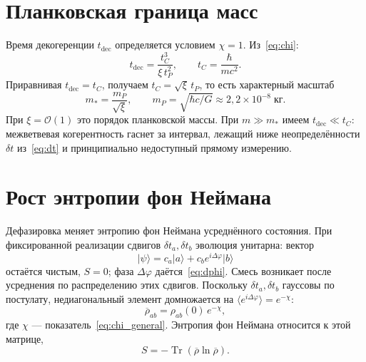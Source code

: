 \documentclass[12pt,a4paper]{article}
\begin{document}
\section{Планковская граница масс}
\label{sec:planck}

Время декогеренции $t_{\mathrm{dec}}$ определяется условием $\chi=1$. Из~\eqref{eq:chi}:
\begin{equation}
t_{\mathrm{dec}}=\frac{t_C^3}{\xi\,t_P^2},
\qquad
t_C=\frac{\hbar}{mc^2}.
\label{eq:tdec}
\end{equation}
Приравнивая $t_{\mathrm{dec}}=t_C$, получаем $t_C=\sqrt{\xi}\,t_P$, то есть характерный масштаб
\begin{equation}
m_\ast=\frac{m_P}{\sqrt{\xi}},
\qquad
m_P=\sqrt{\hbar c/G}\approx 2{,}2\times10^{-8}\;\text{кг}.
\end{equation}
При $\xi=\mathcal O(1)$ это порядок планковской массы. При $m\gg m_\ast$ имеем $t_{\mathrm{dec}}\ll t_C$: межветвевая когерентность гаснет за интервал, лежащий ниже неопределённости $\delta t$ из~\eqref{eq:dt} и принципиально недоступный прямому измерению.

\section{Рост энтропии фон Неймана}
\label{sec:entropy}

Дефазировка меняет энтропию фон Неймана усреднённого состояния. При фиксированной реализации сдвигов $\delta t_a,\delta t_b$ эволюция унитарна: вектор
\begin{equation}
|\psi\rangle=c_a|a\rangle+c_b e^{i\Delta\varphi}|b\rangle
\label{eq:psi_phase}
\end{equation}
остаётся чистым, $S=0$; фаза $\Delta\varphi$ даётся~\eqref{eq:dphi}. Смесь возникает после усреднения по распределению этих сдвигов. Поскольку $\delta t_a,\delta t_b$ гауссовы по постулату, недиагональный элемент домножается на $\langle e^{i\Delta\varphi}\rangle=e^{-\chi}$:
\begin{equation}
\overline{\rho}_{ab}=\rho_{ab}(0)\,e^{-\chi},
\label{eq:rho_avg}
\end{equation}
где $\chi$ --- показатель~\eqref{eq:chi_general}. Энтропия фон Неймана относится к этой матрице,
\begin{equation}
S=-\operatorname{Tr}(\overline{\rho}\ln\overline{\rho}).
\label{eq:SvN}
\end{equation}
\end{document}
